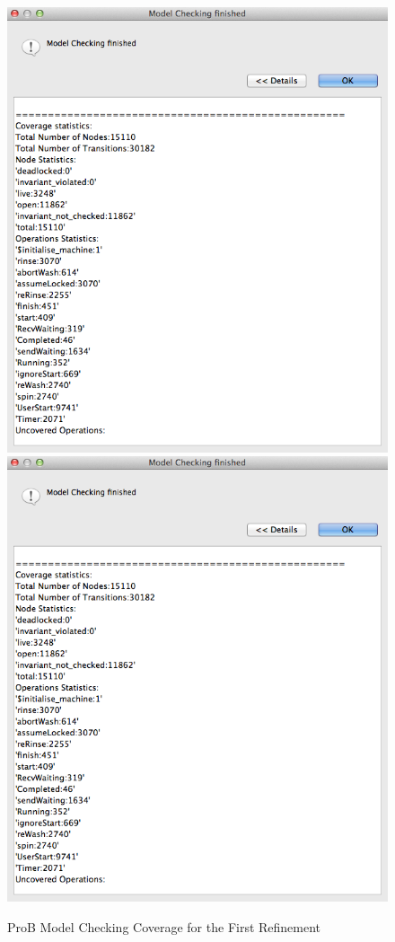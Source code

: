  \begin{figure}[!htbp]
  \centering
  \ifplastex
  \includegraphics[width=1024]{figures/image24.png}
  \else
  \includegraphics[width=1\textwidth]{figures/image24.png}
  \fi
  \caption{ProB Model Checking Coverage for the First Refinement}
  \label{fig:ProBModelCheckingCoverageForTheFirstRefinement}
\end{figure} 


